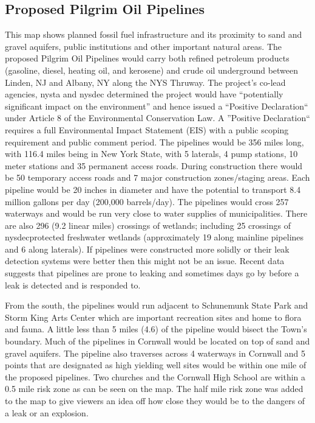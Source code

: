 \subsection{Proposed Pilgrim Oil Pipelines}\label{subec:pilgrim}

\label{map:proposedoilpipelines}
This map shows planned fossil fuel infrastructure and its proximity to sand and 
gravel aquifers, public institutions and other important natural areas. The 
proposed Pilgrim Oil Pipelines would carry both refined petroleum products 
(gasoline, diesel, heating oil, and kerosene) and crude oil underground between 
Linden, NJ and Albany, NY along the NYS Thruway. The project’s co-lead 
agencies, \gls{nysta} and \gls{nysdec} determined the project would have 
``potentially significant impact on the environment'' and hence issued a 
``Positive Declaration`` under Article 8 of the Environmental Conservation 
Law. A ''Positive Declaration`` requires a full Environmental Impact Statement 
(EIS) with a public scoping requirement and public comment period. The pipelines 
would be 356 miles long, with 116.4 miles being in New York State, with 5 
laterals, 4 pump stations, 10 meter stations and 35 permanent access roads. 
During construction there would be 50 temporary access roads and 7 major 
construction zones/staging areas. Each pipeline would be 20 inches in diameter 
and have the potential to transport 8.4 million gallons per day (200,000 
barrels/day). The pipelines would cross 257 waterways and would be run very 
close to water supplies of municipalities. There are also 296 (9.2 linear miles)
crossings of wetlands; including 25 crossings of \gls{nysdec}protected 
freshwater wetlands (approximately 19 along mainline pipelines and 6 along 
laterals). If pipelines were constructed more solidly or their leak detection 
systems were better then this might not be an issue. Recent data suggests that 
pipelines are prone to leaking and sometimes days go by before a leak is 
detected and is responded to.

From the south, the pipelines would run adjacent to Schunemunk State Park and 
Storm King Arts Center which are important recreation sites and home to flora 
and fauna. A little less than 5 miles (4.6) of the pipeline would bisect the 
Town’s boundary. Much of the pipelines in Cornwall would be located on top of 
sand and gravel aquifers. The pipeline also traverses across 4 waterways in 
Cornwall and 5 points that are designated as high yielding well sites would be 
within one mile of the proposed pipelines. Two churches and the Cornwall High 
School are within a 0.5 mile risk zone as can be seen on the map. The half mile 
risk zone was added to the map to give viewers an idea off how close they would 
be to the dangers of a leak or an explosion.

